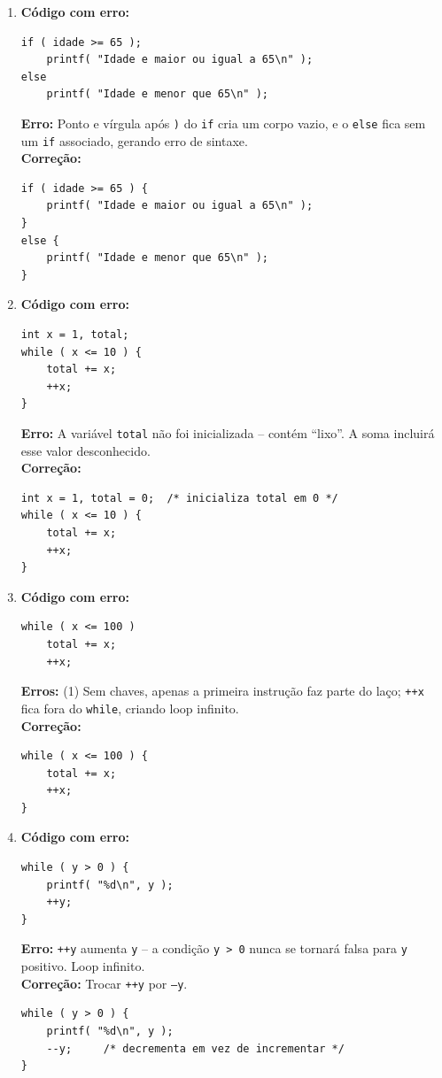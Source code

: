 \documentclass[12pt,a4paper]{article}
\begin{document}
\begin{respostabox}
\begin{enumerate}[label=\textbf{\alph*)}]

\item \textbf{Código com erro:}
\begin{lstlisting}
if ( idade >= 65 );
    printf( "Idade e maior ou igual a 65\n" );
else
    printf( "Idade e menor que 65\n" );
\end{lstlisting}
\textbf{Erro:} Ponto e vírgula após \texttt{)} do \texttt{if} cria um corpo vazio,
e o \texttt{else} fica sem um \texttt{if} associado, gerando erro de sintaxe.\\
\textbf{Correção:}
\begin{lstlisting}
if ( idade >= 65 ) {
    printf( "Idade e maior ou igual a 65\n" );
}
else {
    printf( "Idade e menor que 65\n" );
}
\end{lstlisting}

\item \textbf{Código com erro:}
\begin{lstlisting}
int x = 1, total;
while ( x <= 10 ) {
    total += x;
    ++x;
}
\end{lstlisting}
\textbf{Erro:} A variável \texttt{total} não foi inicializada -- contém ``lixo''.
A soma incluirá esse valor desconhecido.\\
\textbf{Correção:}
\begin{lstlisting}
int x = 1, total = 0;  /* inicializa total em 0 */
while ( x <= 10 ) {
    total += x;
    ++x;
}
\end{lstlisting}

\item \textbf{Código com erro:}
\begin{lstlisting}
while ( x <= 100 )
    total += x;
    ++x;
\end{lstlisting}
\textbf{Erros:} (1) Sem chaves, apenas a primeira instrução faz parte do laço;
\texttt{++x} fica fora do \texttt{while}, criando loop infinito.\\
\textbf{Correção:}
\begin{lstlisting}
while ( x <= 100 ) {
    total += x;
    ++x;
}
\end{lstlisting}

\item \textbf{Código com erro:}
\begin{lstlisting}
while ( y > 0 ) {
    printf( "%d\n", y );
    ++y;
}
\end{lstlisting}
\textbf{Erro:} \texttt{++y} aumenta \texttt{y} -- a condição \texttt{y > 0} nunca
se tornará falsa para \texttt{y} positivo. Loop infinito.\\
\textbf{Correção:} Trocar \texttt{++y} por \texttt{--y}.
\begin{lstlisting}
while ( y > 0 ) {
    printf( "%d\n", y );
    --y;     /* decrementa em vez de incrementar */
}
\end{lstlisting}

\end{enumerate}
\end{respostabox}
\end{document}
